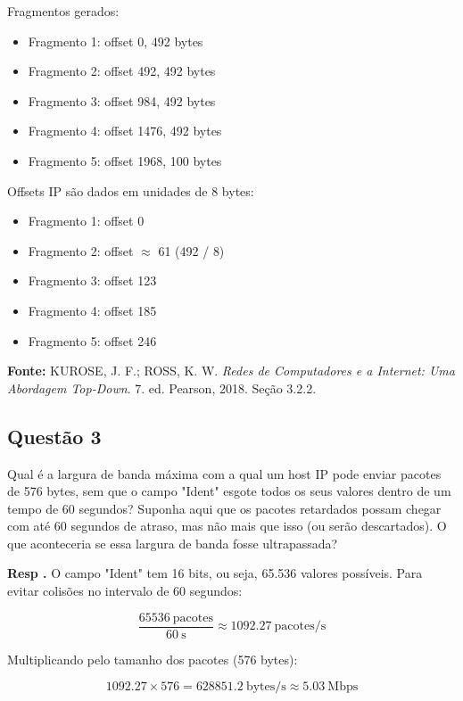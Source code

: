 Fragmentos gerados:
\begin{itemize}
    \item Fragmento 1: offset 0, 492 bytes
    \item Fragmento 2: offset 492, 492 bytes
    \item Fragmento 3: offset 984, 492 bytes
    \item Fragmento 4: offset 1476, 492 bytes
    \item Fragmento 5: offset 1968, 100 bytes
\end{itemize}

Offsets IP são dados em unidades de 8 bytes:

\begin{itemize}
    \item Fragmento 1: offset 0  
    \item Fragmento 2: offset $\approx$ 61 (492 / 8)  
    \item Fragmento 3: offset 123  
    \item Fragmento 4: offset 185  
    \item Fragmento 5: offset 246
\end{itemize}

\textbf{Fonte:} KUROSE, J. F.; ROSS, K. W. \textit{Redes de Computadores e a Internet: Uma Abordagem Top-Down}. 7. ed. Pearson, 2018. Seção 3.2.2.
\newline

\subsection{Questão 3}
Qual é a largura de banda máxima com a qual um host IP pode enviar
pacotes de 576 bytes, sem que o campo "Ident" esgote todos os seus valores
dentro de um tempo de 60 segundos? Suponha aqui que os pacotes retardados possam
chegar com até 60 segundos de atraso, mas não mais que isso (ou serão
descartados). O que aconteceria se essa largura de banda fosse ultrapassada?
\newline

\textbf{Resp .}
O campo "Ident" tem 16 bits, ou seja, 65.536 valores possíveis. Para evitar colisões no intervalo de 60 segundos:

\[
\frac{65536~\text{pacotes}}{60~\text{s}} \approx 1092.27~\text{pacotes/s}
\]

Multiplicando pelo tamanho dos pacotes (576 bytes):

\[
1092.27 \times 576 = 628851.2~\text{bytes/s} \approx 5.03~\text{Mbps}
\]


